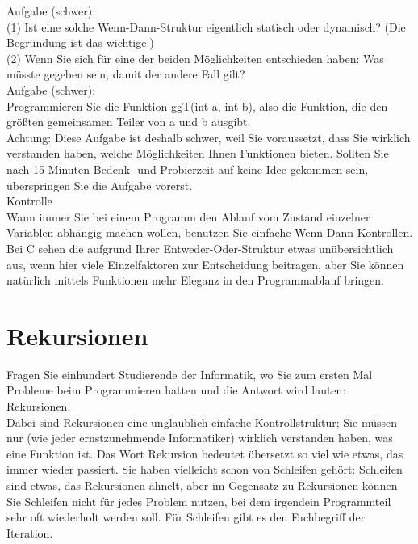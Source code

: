 Aufgabe (schwer): \\

(1)	Ist eine solche Wenn-Dann-Struktur eigentlich statisch oder dynamisch? (Die Begründung ist das wichtige.)\\

(2)	Wenn Sie sich für eine der beiden Möglichkeiten entschieden haben: Was müsste gegeben sein, damit der andere Fall gilt?\\

Aufgabe (schwer):\\

Programmieren Sie die Funktion ggT(int a, int b), also die Funktion, die den größten gemeinsamen Teiler von a und b ausgibt.\\

Achtung: Diese Aufgabe ist deshalb schwer, weil Sie voraussetzt, dass Sie wirklich verstanden haben, welche Möglichkeiten Ihnen Funktionen bieten. Sollten Sie nach 15 Minuten Bedenk- und Probierzeit auf keine Idee gekommen sein, überspringen Sie die Aufgabe vorerst.\\

Kontrolle\\

Wann immer Sie bei einem Programm den Ablauf vom Zustand einzelner Variablen abhängig machen wollen, benutzen Sie einfache Wenn-Dann-Kontrollen. Bei C sehen die aufgrund Ihrer Entweder-Oder-Struktur etwas unübersichtlich aus, wenn hier viele Einzelfaktoren zur Entscheidung beitragen, aber Sie können natürlich mittels Funktionen mehr Eleganz in den Programmablauf bringen.

\section{Rekursionen}

Fragen Sie einhundert Studierende der Informatik, wo Sie zum ersten Mal Probleme beim Programmieren hatten und die Antwort wird lauten: Rekursionen. \\

Dabei sind Rekursionen eine unglaublich einfache Kontrollstruktur; Sie müssen nur (wie jeder ernstzunehmende Informatiker) wirklich verstanden haben, was eine Funktion ist. Das Wort Rekursion bedeutet übersetzt so viel wie \glqq{}etwas, das immer wieder passiert\grqq{}. Sie haben vielleicht schon von Schleifen gehört: Schleifen sind etwas, das Rekursionen ähnelt, aber im Gegensatz zu Rekursionen können Sie Schleifen nicht für jedes Problem nutzen, bei dem irgendein Programmteil sehr oft wiederholt werden soll. Für Schleifen gibt es den Fachbegriff der Iteration.

